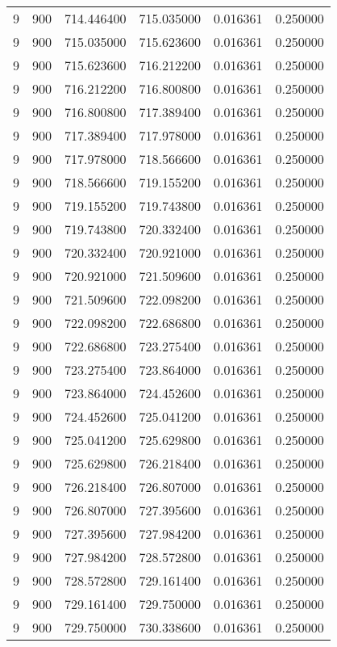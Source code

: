 \begin{longtable}{rrrrrr}
9 & 900 & 714.446400 & 715.035000 & 0.016361 & 0.250000 \\
9 & 900 & 715.035000 & 715.623600 & 0.016361 & 0.250000 \\
9 & 900 & 715.623600 & 716.212200 & 0.016361 & 0.250000 \\
9 & 900 & 716.212200 & 716.800800 & 0.016361 & 0.250000 \\
9 & 900 & 716.800800 & 717.389400 & 0.016361 & 0.250000 \\
9 & 900 & 717.389400 & 717.978000 & 0.016361 & 0.250000 \\
9 & 900 & 717.978000 & 718.566600 & 0.016361 & 0.250000 \\
9 & 900 & 718.566600 & 719.155200 & 0.016361 & 0.250000 \\
9 & 900 & 719.155200 & 719.743800 & 0.016361 & 0.250000 \\
9 & 900 & 719.743800 & 720.332400 & 0.016361 & 0.250000 \\
9 & 900 & 720.332400 & 720.921000 & 0.016361 & 0.250000 \\
9 & 900 & 720.921000 & 721.509600 & 0.016361 & 0.250000 \\
9 & 900 & 721.509600 & 722.098200 & 0.016361 & 0.250000 \\
9 & 900 & 722.098200 & 722.686800 & 0.016361 & 0.250000 \\
9 & 900 & 722.686800 & 723.275400 & 0.016361 & 0.250000 \\
9 & 900 & 723.275400 & 723.864000 & 0.016361 & 0.250000 \\
9 & 900 & 723.864000 & 724.452600 & 0.016361 & 0.250000 \\
9 & 900 & 724.452600 & 725.041200 & 0.016361 & 0.250000 \\
9 & 900 & 725.041200 & 725.629800 & 0.016361 & 0.250000 \\
9 & 900 & 725.629800 & 726.218400 & 0.016361 & 0.250000 \\
9 & 900 & 726.218400 & 726.807000 & 0.016361 & 0.250000 \\
9 & 900 & 726.807000 & 727.395600 & 0.016361 & 0.250000 \\
9 & 900 & 727.395600 & 727.984200 & 0.016361 & 0.250000 \\
9 & 900 & 727.984200 & 728.572800 & 0.016361 & 0.250000 \\
9 & 900 & 728.572800 & 729.161400 & 0.016361 & 0.250000 \\
9 & 900 & 729.161400 & 729.750000 & 0.016361 & 0.250000 \\
9 & 900 & 729.750000 & 730.338600 & 0.016361 & 0.250000 \\

\end{longtable}
